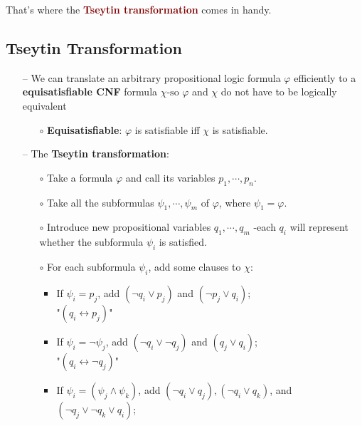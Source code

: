 That's where the \textbf{\textcolor{Maroon}{Tseytin transformation}} comes in handy.

\subsection{Tseytin Transformation}
\begin{itemize}
    \item[--] We can translate an arbitrary propositional logic formula $\varphi$ efficiently to a \\ \textbf{\textcolor{WildStrawberry}{equisatisfiable CNF}} formula $\chi \text{-so } \varphi$ and $\chi$ do not have to be logically equivalent
    \begin{itemize}
        \item[$\circ$] \textbf{\textcolor{WildStrawberry}{Equisatisfiable}}: $\varphi$ is satisfiable iff $\chi$ is satisfiable. 
    \end{itemize}
    \newpage
    \item[--] The \textbf{Tseytin transformation}:
    \begin{itemize}
        \item[$\circ$] Take a formula $\varphi$ and call its variables $p_1, \cdots, p_n$.
        \item[$\circ$] Take all the subformulas $\psi_1, \cdots, \psi_m$ of $\varphi$, where $\psi_1 = \varphi$.
        \item[$\circ$] Introduce new propositional variables $q_1, \cdots, q_m$ -each $q_i$ will represent whether the subformula $\psi_i$ is satisfied.
        \item[$\circ$] For each subformula $\psi_i$, add some clauses to $\chi$:
        \begin{itemize}
            \item If $\psi_i = p_j$, \;\;\;\;\;\;\;\;\;\;\;\;\;\;\; add $(\neg q_i \vee p_j)$ and $(\neg p_j \vee q_i)$; \\
            "$(q_i \leftrightarrow p_j)$"
            \\
            \item If $\psi_i = \neg \psi_j$, \;\;\;\;\;\;\;\;\;\;\;\; add $(\neg q_i \vee \neg q_j)$ and $(q_j \vee q_i)$;  \\ "$(q_i \leftrightarrow \neg q_j)$"
            \\
            \item If $\psi_{i}=\left(\psi_{j} \wedge \psi_{k}\right)$, \;\;\;\; add $\left(\neg q_{i} \vee q_{j}\right),\left(\neg q_{i} \vee q_{k}\right)$, and $\left(\neg q_{j} \vee \neg q_{k} \vee q_{i}\right)$; \\

\end{itemize}
\end{itemize}
\end{itemize}
